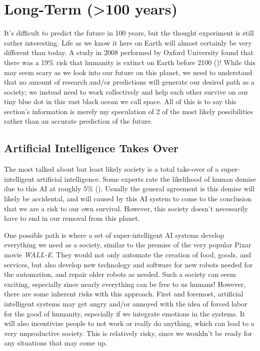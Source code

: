 \section{Long-Term (>100 years)}
\label{sec:long}

It's difficult to predict the future in 100 years, but the thought experiment is still rather interesting. Life as we know it here on Earth will almost certainly be very different than today. A study in 2008 performed by Oxford University found that there was a 19\% risk that humanity is extinct on Earth before 2100 (\cite{WeDead100Years})! While this may seem scary as we look into our future on this planet, we need to understand that no amount of research and/or predictions will generate our desired path as a society; we instead need to work collectively and help each other survive on our tiny blue dot in this vast black ocean we call space. All of this is to say this section's information is merely my speculation of 2 of the most likely possibilities rather than an accurate prediction of the future.

\subsection{Artificial Intelligence Takes Over}

The most talked about but least likely society is a total take-over of a super-intelligent artificial intelligence. Some experts rate the likelihood of human demise due to this AI at roughly 5\% (\cite{WeDead100Years}). Usually the general agreement is this demise will likely be accidental, and will caused by this AI system to come to the conclusion that we are a risk to our own survival. However, this society doesn't necessarily have to end in our removal from this planet.

One possible path is where a set of super-intelligent AI systems develop everything we need as a society, similar to the premise of the very popular Pixar movie \emph{WALL-E}. They would not only automate the creation of food, goods, and services, but also develop new technology and software for new robots needed for the automation, and repair older robots as needed. Such a society can seem exciting, especially since nearly everything can be free to us humans! However, there are some inherent risks with this approach. First and foremost, artificial intelligent systems may get angry and/or annoyed with the idea of forced labor for the good of humanity, especially if we integrate emotions in the systems. It will also incentivize people to not work or really do anything, which can lead to a very unproductive society. This is relatively risky, since we wouldn't be ready for any situations that may come up.

